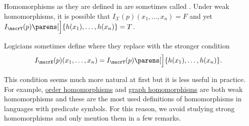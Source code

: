 \begin{remark}\label{rem:first_order_strong_homomorphism}
  Homomorphisms as they are defined in  are sometimes called . Under weak homomorphisms, it is possible that \( I_\mscrX(p) (x_1, \ldots, x_n) = F \) and yet \( I_\mscrY(p) \parens[\Big]{ h(x_1), \ldots, h(x_n) } = T \).

  Logicians sometimes define  where they replace  with the stronger condition
  \begin{equation*}
    I_\mscrX(p) (x_1, \ldots, x_n) = I_\mscrY(p) \parens[\Big]{ h(x_1), \ldots, h(x_n) }.
  \end{equation*}

  This condition seems much more natural at first but it is less useful in practice. For example, \hyperref[def:preordered_set/homomorphism]{order homomorphisms} and \hyperref[def:graph_homomorphism]{graph homomorphisms} are both weak homomorphisms and these are the most used definitions of homomorphisms in languages with predicate symbols. For this reason, we avoid studying strong homomorphisms and only mention them in a few remarks.
\end{remark}

